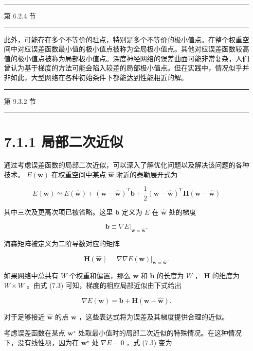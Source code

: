 \documentclass[10pt]{report}
\newcommand{\HRule}{\begin{center}\rule{0.9\linewidth}{0.2mm}\end{center}}
\begin{document}
\HRule

第 6.2.4 节

\HRule

此外，可能存在多个不等价的驻点，特别是多个不等价的极小值点。在整个权重空间中对应误差函数最小值的极小值点被称为全局极小值点。其他对应误差函数较高值的极小值点被称为局部极小值点。深度神经网络的误差曲面可能非常复杂，人们曾认为基于梯度的方法可能会陷入较差的局部极小值点。但在实践中，情况似乎并非如此，大型网络在各种初始条件下都能达到性能相近的解。

\HRule

第 9.3.2 节

\HRule

\section*{7.1.1 局部二次近似}

通过考虑误差函数的局部二次近似，可以深入了解优化问题以及解决该问题的各种技术。 \(E\left( \mathbf{w}\right)\) 在权重空间中某点 \(\widehat{\mathbf{w}}\) 附近的泰勒展开式为

\[
E\left( \mathbf{w}\right)  \simeq  E\left( \widehat{\mathbf{w}}\right)  + {\left( \mathbf{w} - \widehat{\mathbf{w}}\right) }^{\mathrm{T}}\mathbf{b} + \frac{1}{2}{\left( \mathbf{w} - \widehat{\mathbf{w}}\right) }^{\mathrm{T}}\mathbf{H}\left( {\mathbf{w} - \widehat{\mathbf{w}}}\right)  \tag{7.3}
\]

其中三次及更高次项已被省略。这里 \(\mathbf{b}\) 定义为 \(E\) 在 \(\widehat{\mathbf{w}}\) 处的梯度

\[
\mathbf{b} \equiv  {\left. \nabla E\right| }_{\mathbf{w} = \widehat{\mathbf{w}}}. \tag{7.4}
\]

海森矩阵被定义为二阶导数对应的矩阵

\[
\mathbf{H}\left( \widehat{\mathbf{w}}\right)  = {\left. \nabla \nabla E\left( \mathbf{w}\right) \right| }_{\mathbf{w} = \widehat{\mathbf{w}}}. \tag{7.5}
\]

如果网络中总共有 \(W\) 个权重和偏置，那么 \(\mathbf{w}\) 和 \(\mathbf{b}\) 的长度为 \(W\) ， \(\mathbf{H}\) 的维度为 \(W \times  W\) 。由式 (7.3) 可知，梯度的相应局部近似由下式给出

\[
\nabla E\left( \mathbf{w}\right)  = \mathbf{b} + \mathbf{H}\left( {\mathbf{w} - \widehat{\mathbf{w}}}\right) . \tag{7.6}
\]

对于足够接近 \(\widehat{\mathbf{w}}\) 的点 \(\mathbf{w}\) ，这些表达式将为误差及其梯度提供合理的近似。

考虑误差函数在某点 \({\mathbf{w}}^{ \star  }\) 处取最小值时的局部二次近似的特殊情况。在这种情况下，没有线性项，因为在 \({\mathbf{w}}^{ \star  }\) 处 \(\nabla E = 0\) ，式 (7.3) 变为
\end{document}
